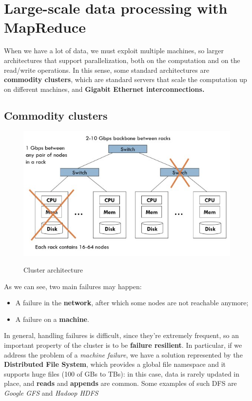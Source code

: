\section{Large-scale data processing with MapReduce}
When we have a lot of data, we must exploit multiple machines, so larger architectures that support parallelization, both on the computation and on the read/write operations. In this sense, some standard architectures are \textbf{commodity clusters}, which are standard servers that scale the computation up on different machines, and \textbf{Gigabit Ethernet interconnections.}

\subsection{Commodity clusters}

\begin{figure}[h!]
		\centering
		\includegraphics[scale = 2.0]{img/cluster.jpg}
        \label{cl arch}
        \caption{Cluster architecture}
\end{figure}

As we can see, two main failures may happen:

\begin{itemize}
    \item A failure in the \textbf{network}, after which some nodes are not reachable anymore;
    \item A failure on a \textbf{machine}.
\end{itemize}

In general, handling failures is difficult, since they're extremely frequent, so an important property of the cluster is to be \textbf{failure resilient}. In particular, if we address the problem of a \textit{machine failure}, we have a solution represented by the \textbf{Distributed File System}, which provides a global file namespace and it supports huge files (100 of GBs to TBs): in this case, data is rarely updated in place, and \textbf{reads} and \textbf{appends} are common. Some examples of such DFS are \textit{Google GFS} and \textit{Hadoop HDFS}


